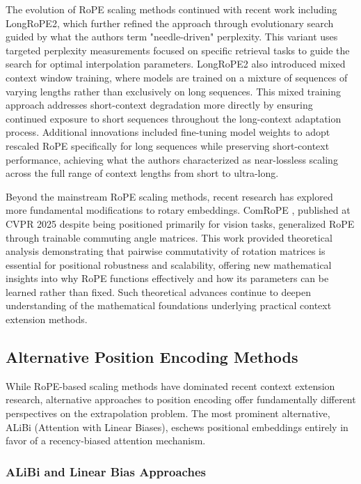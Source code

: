 The evolution of RoPE scaling methods continued with recent work including LongRoPE2, which further refined the approach through evolutionary search guided by what the authors term "needle-driven" perplexity. This variant uses targeted perplexity measurements focused on specific retrieval tasks to guide the search for optimal interpolation parameters. LongRoPE2 also introduced mixed context window training, where models are trained on a mixture of sequences of varying lengths rather than exclusively on long sequences. This mixed training approach addresses short-context degradation more directly by ensuring continued exposure to short sequences throughout the long-context adaptation process. Additional innovations included fine-tuning model weights to adopt rescaled RoPE specifically for long sequences while preserving short-context performance, achieving what the authors characterized as near-lossless scaling across the full range of context lengths from short to ultra-long.

Beyond the mainstream RoPE scaling methods, recent research has explored more fundamental modifications to rotary embeddings. ComRoPE \citep{yu2025comrope}, published at CVPR 2025 despite being positioned primarily for vision tasks, generalized RoPE through trainable commuting angle matrices. This work provided theoretical analysis demonstrating that pairwise commutativity of rotation matrices is essential for positional robustness and scalability, offering new mathematical insights into why RoPE functions effectively and how its parameters can be learned rather than fixed. Such theoretical advances continue to deepen understanding of the mathematical foundations underlying practical context extension methods.

\subsection{Alternative Position Encoding Methods}

While RoPE-based scaling methods have dominated recent context extension research, alternative approaches to position encoding offer fundamentally different perspectives on the extrapolation problem. The most prominent alternative, ALiBi (Attention with Linear Biases), eschews positional embeddings entirely in favor of a recency-biased attention mechanism.

\subsubsection{ALiBi and Linear Bias Approaches}

